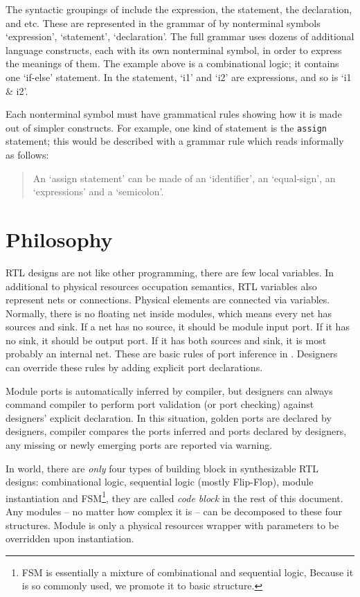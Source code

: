 The syntactic groupings of \vlog{} include the expression, the
statement, the declaration, and etc. These are represented in the
grammar of \vlog{} by nonterminal symbols `expression', `statement',
`declaration'. The full grammar uses dozens of additional language
constructs, each with its own nonterminal symbol, in order to express
the meanings of them. The example above is a combinational logic; it
contains one `if-else' statement. In the statement, `i1' and `i2' are
expressions, and so is `i1 \& i2'.

Each nonterminal symbol must have grammatical rules showing how it is
made out of simpler constructs. For example, one kind of \vlog{}
statement is the \texttt{assign} statement; this would be described
with a grammar rule which reads informally as follows:
\begin{quote}
An `assign statement' can be made of an `identifier', an `equal-sign',
an `expressions' and a `semicolon'.
\end{quote}


\section{\mhdl{} Philosophy}
RTL designs are not like other programming, there are few local
variables.  In additional to physical resources occupation semantics,
RTL variables also represent nets or connections. Physical elements
are connected via variables. Normally, there is no floating net inside
modules, which means every net has sources and sink. If a net has no
source, it should be module input port. If it has no sink, it should
be output port.  If it has both sources and sink, it is most probably
an internal net. These are basic rules of port inference
in \mhdlc{}. Designers can override these rules by adding explicit
port declarations.

Module ports is automatically inferred by compiler, but designers
can always command compiler to perform port validation (or port
checking) against designers' explicit declaration. In this situation,
golden ports are declared by designers, compiler compares the ports
inferred and ports declared by designers, any missing or newly
emerging ports are reported via warning.


In \mhdl{} world, there are \emph{only} four types of building block
in synthesizable RTL designs: combinational logic, sequential logic
(mostly Flip-Flop), module instantiation and FSM\footnote{ FSM is
essentially a mixture of combinational and sequential logic, Because
it is so commonly used, we promote it to basic structure.}, they are
called \emph{code block} in the rest of this
document. Any modules -- no matter how complex it is -- can be
decomposed to these four structures. Module is only a physical
resources wrapper with parameters to be overridden upon instantiation.

